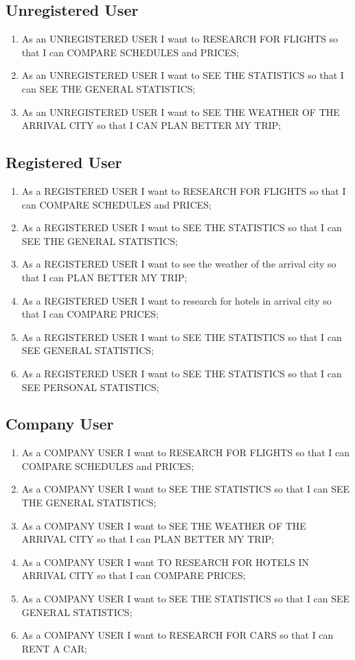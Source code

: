 \documentclass[11pt]{article}
\begin{document}
\subsection{Unregistered User}
\begin{enumerate}
	\item As an UNREGISTERED USER I want to RESEARCH FOR FLIGHTS so that I can COMPARE SCHEDULES and PRICES;
	\item As an UNREGISTERED USER I want to SEE THE STATISTICS so that I can SEE THE GENERAL STATISTICS;
	\item As an UNREGISTERED USER I want to SEE THE WEATHER OF THE ARRIVAL CITY so that I CAN PLAN BETTER MY TRIP;
\end{enumerate}

\subsection{Registered User}
\begin{enumerate}
	\item As a REGISTERED USER I want to RESEARCH FOR FLIGHTS so that I can COMPARE SCHEDULES and PRICES;
	\item As a REGISTERED USER I want to SEE THE STATISTICS so that I can SEE THE GENERAL STATISTICS;
	\item As a REGISTERED USER I want to see the weather of the arrival city so that I can PLAN BETTER MY TRIP;
	\item As a REGISTERED USER I want to research for hotels in arrival city so that I can COMPARE PRICES;
	\item As a REGISTERED USER I want to SEE THE STATISTICS so that I can SEE GENERAL STATISTICS;
	\item As a REGISTERED USER I want to SEE THE STATISTICS so that I can SEE PERSONAL STATISTICS;
\end{enumerate}

\subsection{Company User}
\begin{enumerate}
	\item As a COMPANY USER I want to RESEARCH FOR FLIGHTS so that I can COMPARE SCHEDULES and PRICES;
	\item As a COMPANY USER I want to SEE THE STATISTICS so that I can SEE THE GENERAL STATISTICS;
	\item As a COMPANY USER I want to SEE THE WEATHER OF THE ARRIVAL CITY so that I can PLAN BETTER MY TRIP;
	\item As a COMPANY USER I want TO RESEARCH FOR HOTELS IN ARRIVAL CITY so that I can COMPARE PRICES;
	\item As a COMPANY USER I want to SEE THE STATISTICS so that I can SEE GENERAL STATISTICS;
	\item As a COMPANY USER I want to RESEARCH FOR CARS so that I can RENT A CAR;
\end{enumerate}
\end{document}
